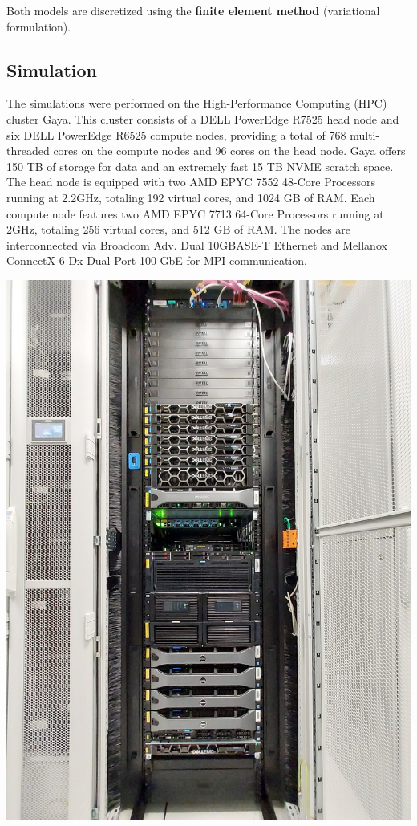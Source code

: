 \documentclass[12pt]{article}
\begin{document}
Both models are discretized using the \textbf{finite element method} (variational
formulation).

\subsection{Simulation}
\begin{minipage}[t]{0.49\textwidth}
  \justifying
  The simulations were performed on the High-Performance Computing (HPC) cluster Gaya.
  This cluster consists of a DELL PowerEdge R7525 head node and six DELL PowerEdge
  R6525 compute nodes, providing a total of 768 multi-threaded cores on the compute
  nodes and 96 cores on the head node. Gaya offers 150 TB of storage for data and
  an extremely fast 15 TB NVME scratch space. The head node is equipped with two AMD EPYC 7552 48-Core Processors running at
  2.2GHz, totaling 192 virtual cores, and 1024 GB of RAM.
  Each compute node features two AMD EPYC 7713 64-Core Processors running at 2GHz,
  totaling 256 virtual cores, and 512 GB of RAM. The nodes are interconnected via
  Broadcom Adv. Dual 10GBASE-T Ethernet and Mellanox ConnectX-6 Dx Dual Port 100
  GbE for MPI communication.
\end{minipage}
\hfill
\begin{minipage}[t]{0.49\textwidth}
  \centering
  \includegraphics[width=1.1\textwidth, angle=-90]{images/gaya.jpeg}
\end{minipage}
\end{document}
